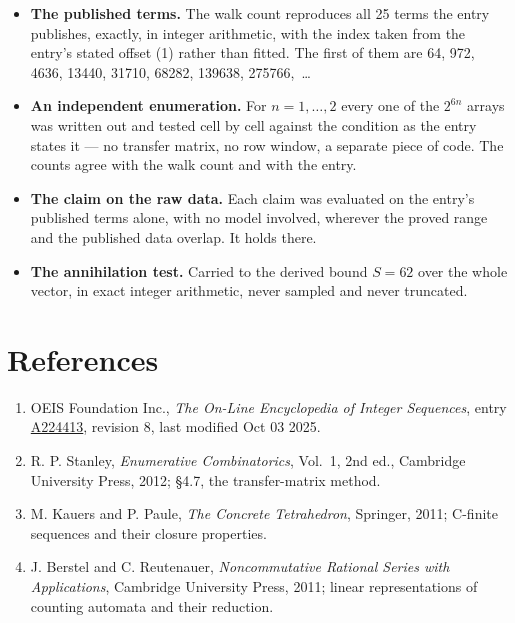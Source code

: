 \documentclass[11pt]{article}
\theoremstyle{definition}
\begin{document}
\begin{itemize}

\item {\bfseries The published terms.} The walk count reproduces all 25 terms the entry publishes, exactly, in integer arithmetic, with the index taken from the entry's stated offset (1) rather than fitted. The first of them are 64, 972, 4636, 13440, 31710, 68282, 139638, 275766,~\dots

\item {\bfseries An independent enumeration.} For $n = 1,\dots,2$ every one of the $2^{6n}$ arrays was written out and tested cell by cell against the condition as the entry states it --- no transfer matrix, no row window, a separate piece of code. The counts agree with the walk count and with the entry.

\item {\bfseries The claim on the raw data.} Each claim was evaluated on the entry's published terms alone, with no model involved, wherever the proved range and the published data overlap. It holds there.

\item {\bfseries The annihilation test.} Carried to the derived bound $S = 62$ over the whole vector, in exact integer arithmetic, never sampled and never truncated.

\end{itemize}

\section{References}

\begin{enumerate}

\item OEIS Foundation Inc., \emph{The On-Line Encyclopedia of Integer Sequences}, entry \href{https://oeis.org/A224413}{A224413}, revision 8, last modified Oct 03 2025.

\item R. P. Stanley, \emph{Enumerative Combinatorics}, Vol.~1, 2nd ed., Cambridge University Press, 2012; \S4.7, the transfer-matrix method.

\item M. Kauers and P. Paule, \emph{The Concrete Tetrahedron}, Springer, 2011; C-finite sequences and their closure properties.

\item J. Berstel and C. Reutenauer, \emph{Noncommutative Rational Series with Applications}, Cambridge University Press, 2011; linear representations of counting automata and their reduction.

\end{enumerate}
\end{document}
